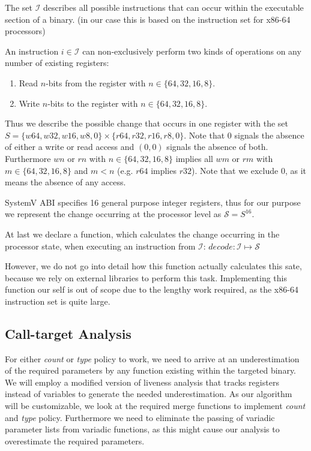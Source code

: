The set $\mathcal{I}$ describes all possible instructions that can occur within the executable section of a binary. (in our case this is based on the instruction set for x86-64 processors)

An instruction $i \in \mathcal{I}$ can non-exclusively perform two kinds of operations on any number of existing registers:

\begin{enumerate}
\item Read $n$-bits from the register with $n \in \{ 64, 32, 16, 8 \}$.
\item Write $n$-bits to the register with $n \in \{ 64, 32, 16, 8 \}$.
\end{enumerate}

Thus we describe the possible change that occurs in one register with the set $S = \{ w64, w32, w16, w8, 0 \} \times \{r64, r32, r16, r8, 0 \}$. Note that 0 signals the absence of either a write or read access and $(0, 0)$ signals the absence of both. Furthermore $wn$ or $rn$ with $n \in \{64,32,16,8\}$ implies all $wm$ or $rm$ with $m \in \{64,32,16,8\}$ and $m < n$ (e.g. $r64$ implies $r32$). Note that we exclude 0, as it means the absence of any access.

SystemV ABI specifies 16 general purpose integer registers, thus for our purpose we represent the change occurring at the processor level as $\mathcal{S} = S^{16}$.

At last we declare a function, which calculates the change occurring in the processor state, when executing an instruction from $\mathcal{I}$:
$
decode : \mathcal{I} \mapsto \mathcal{S}
$

However, we do not go into detail how this function actually calculates this sate, because we rely on external libraries to perform this task. Implementing this function our self is out of scope due to the lengthy work required, as the x86-64 instruction set is quite large.

\subsection{Call-target Analysis}
\label{section:calltargetanalysis}
For either \emph{count} or \emph{type} policy to work, we need to arrive at an underestimation of the required parameters by any function existing within the targeted 
binary. We will employ a modified version of liveness analysis that tracks registers instead of variables to generate the needed underestimation. As our algorithm will 
be customizable, we look at the required merge functions to implement \emph{count} and \emph{type} policy. Furthermore we need to eliminate the passing of variadic 
parameter lists from variadic functions, as this might cause our analysis to overestimate the required parameters.


